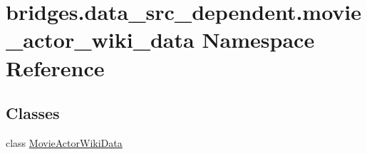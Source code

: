 \hypertarget{namespacebridges_1_1data__src__dependent_1_1movie__actor__wiki__data}{}\section{bridges.\+data\+\_\+src\+\_\+dependent.\+movie\+\_\+actor\+\_\+wiki\+\_\+data Namespace Reference}
\label{namespacebridges_1_1data__src__dependent_1_1movie__actor__wiki__data}
\subsection*{Classes}
\begin{DoxyCompactItemize}
\item 
class \mbox{\hyperlink{classbridges_1_1data__src__dependent_1_1movie__actor__wiki__data_1_1_movie_actor_wiki_data}{Movie\+Actor\+Wiki\+Data}}
\end{DoxyCompactItemize}
